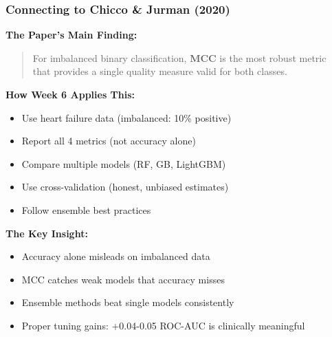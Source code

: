 \documentclass{beamer}
\begin{document}
\begin{frame}[fragile]
\frametitle{Connecting to Chicco \& Jurman (2020)}

\textbf{The Paper's Main Finding:}

\begin{quote}
For imbalanced binary classification, \textbf{MCC} is the most robust metric \\
that provides a single quality measure valid for both classes.
\end{quote}

\vspace{0.3cm}
\textbf{How Week 6 Applies This:}

\begin{itemize}
    \item[\checkmark] Use heart failure data (imbalanced: 10\% positive)

    \item[\checkmark] Report all 4 metrics (not accuracy alone)

    \item[\checkmark] Compare multiple models (RF, GB, LightGBM)

    \item[\checkmark] Use cross-validation (honest, unbiased estimates)

    \item[\checkmark] Follow ensemble best practices
\end{itemize}

\vspace{0.3cm}
\textbf{The Key Insight:}

\begin{itemize}
    \item Accuracy alone misleads on imbalanced data
    \item MCC catches weak models that accuracy misses
    \item Ensemble methods beat single models consistently
    \item Proper tuning gains: +0.04-0.05 ROC-AUC is clinically meaningful
\end{itemize}

\end{frame}
\end{document}

